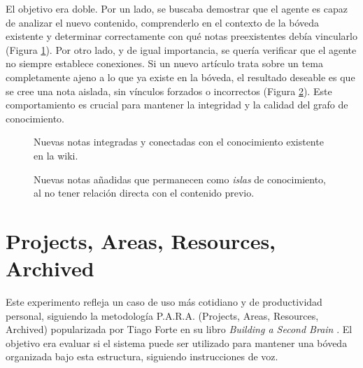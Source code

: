 El objetivo era doble. Por un lado, se buscaba demostrar que el agente es capaz de analizar el nuevo contenido, comprenderlo en el contexto de la bóveda existente y determinar correctamente con qué notas preexistentes debía vincularlo (Figura \ref{fig:wiki_cluster}). Por otro lado, y de igual importancia, se quería verificar que el agente no siempre establece conexiones. Si un nuevo artículo trata sobre un tema completamente ajeno a lo que ya existe en la bóveda, el resultado deseable es que se cree una nota aislada, sin vínculos forzados o incorrectos (Figura \ref{fig:wiki_isolated}). Este comportamiento es crucial para mantener la integridad y la calidad del grafo de conocimiento.

\begin{figure}[h]
    \centering
    \caption{Nuevas notas integradas y conectadas con el conocimiento existente en la wiki.}
    \label{fig:wiki_cluster}
\end{figure}
\begin{figure}[h]
    \centering
    \caption{Nuevas notas añadidas que permanecen como \textit{islas} de conocimiento, al no tener relación directa con el contenido previo.}
    \label{fig:wiki_isolated}
\end{figure}


\section{Projects, Areas, Resources, Archived}
Este experimento refleja un caso de uso más cotidiano y de productividad personal, siguiendo la metodología P.A.R.A. (Projects, Areas, Resources, Archived) popularizada por Tiago Forte en su libro \textit{Building a Second Brain} \cite{forteBuildingSecondBrain2022}. El objetivo era evaluar si el sistema puede ser utilizado para mantener una bóveda organizada bajo esta estructura, siguiendo instrucciones de voz.

